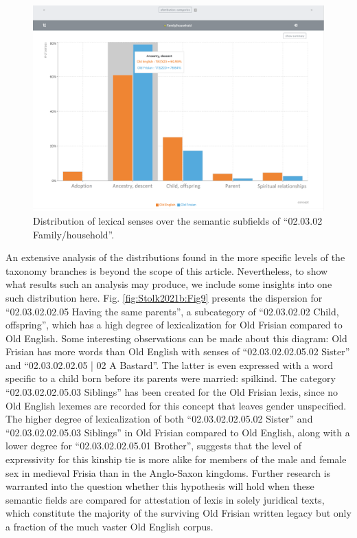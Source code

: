 \begin{figure}[htbp]
	\includegraphics[width=\textwidth]{Stolk2021b/fig/Fig8.png}
	\caption[]{\label{fig:Stolk2021b:Fig8} Distribution of lexical senses over the semantic subfields of “02.03.02 Family/household”.}
\end{figure}


An extensive analysis of the distributions found in the more specific levels of the taxonomy branches is beyond the scope of this article. Nevertheless, to show what results such an analysis may produce, we include some insights into one such distribution here. Fig. \ref{fig:Stolk2021b:Fig9} presents the dispersion for “02.03.02.02.05 Having the same parents”, a subcategory of “02.03.02.02 Child, offspring”, which has a high degree of lexicalization for Old Frisian compared to Old English.  Some interesting observations can be made about this diagram: Old Frisian has more words than Old English with senses of “02.03.02.02.05.02 Sister” and “02.03.02.02.05 | 02 A Bastard”. The latter is even expressed with a word specific to a child born before its parents were married: spilkind. The category “02.03.02.02.05.03 Siblings” has been created for the Old Frisian lexis, since no Old English lexemes are recorded for this concept that leaves gender unspecified. The higher degree of lexicalization of both “02.03.02.02.05.02 Sister” and “02.03.02.02.05.03 Siblings” in Old Frisian compared to Old English, along with a lower degree for “02.03.02.02.05.01 Brother”, suggests that the level of expressivity for this kinship tie is more alike for members of the male and female sex in medieval Frisia than in the Anglo-Saxon kingdoms. Further research is warranted into the question whether this hypothesis will hold when these semantic fields are compared for attestation of lexis in solely juridical texts, which constitute the majority of the surviving Old Frisian written legacy but only a fraction of the much vaster Old English corpus.


